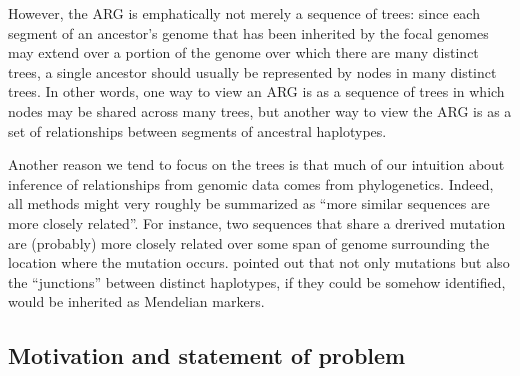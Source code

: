 \documentclass[10pt,twoside,lineno]{gsajnl}
\begin{document}
However, the ARG is emphatically not merely a sequence of trees:
since each segment of an ancestor's genome that has been inherited by the focal genomes
may extend over a portion of the genome over which there are many distinct trees,
a single ancestor should usually be represented by nodes in many distinct trees.
In other words, one way to view an ARG is as a sequence of trees in which nodes may be shared across many trees,
but another way to view the ARG is as a set of relationships between segments of ancestral haplotypes.

Another reason we tend to focus on the trees is that
much of our intuition about inference of relationships from genomic data
comes from phylogenetics.
Indeed, all methods might very roughly be summarized as
``more similar sequences are more closely related''.
For instance, two sequences that share a drerived mutation
are (probably) more closely related over some span of genome surrounding the location where the mutation occurs.
\citet{fisher} pointed out that not only mutations
but also the ``junctions'' between distinct haplotypes,
if they could be somehow identified,
would be inherited as Mendelian markers.

\subsection{Motivation and statement of problem}

\end{document}

